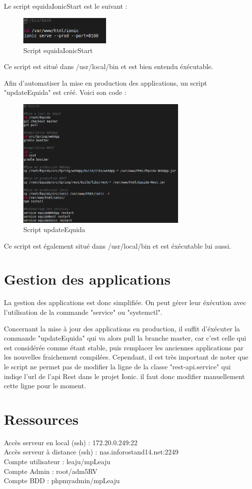 \documentclass[report]{BetterDocument}
\begin{document}
		Le script equidaIonicStart est le suivant :

		\begin{figure}[H]
			\centering\includegraphics[width=0.4\textwidth, keepaspectratio]{res/script-equidaIonicStart.png}
			\caption{Script equidaIonicStart}
		\end{figure}

		Ce script est situé dans /usr/local/bin et est bien entendu éxécutable.

		Afin d'automatiser la mise en production des applications, un script "updateEquida" est créé. Voici son code :

		\begin{figure}[H]
			\centering\includegraphics[width=0.75\textwidth, keepaspectratio]{res/script-updateEquida.png}
			\caption{Script updateEquida}
		\end{figure}

		Ce script est également situé dans /usr/local/bin et est éxécutable lui aussi.

	\chapter{Gestion des applications}

		La gestion des applications est donc simplifiée. On peut gérer leur éxécution avec l'utilisation de la commande "service" ou "systemctl".

		Concernant la mise à jour des applications en production, il suffit d'éxécuter la commande "updateEquida" qui va alors pull la branche master, car c'est celle qui est considérée comme étant stable, puis remplacer les anciennes applications par les nouvelles fraichement compilées. Cependant, il est très important de noter que le script ne permet pas de modifier la ligne de la classe "rest-api.service" qui indiqe l'url de l'api Rest dans le projet Ionic. il faut donc modifier manuellement cette ligne pour le moment.

	\chapter{Ressources}
		\label{sec:ressources}
		\noindent
		Accès serveur en local (ssh) : 172.20.0.249:22\\
		Accès serveur à distance (ssh) : nas.inforostand14.net:2249\\
		Compte utilisateur : leaju/mpLeaju\\
		Compte Admin : root/adm5RV\\
		Compte BDD : phpmyadmin/mpLeaju
\end{document}
